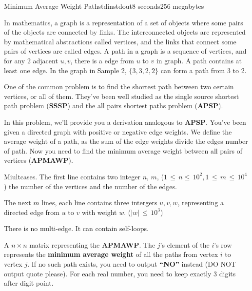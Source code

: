 \begin{problem}{Minimum Average Weight Path}{stdin}{stdout}{8 seconds}{256 megabytes}

In mathematics, a graph is a representation of a set of objects where some pairs of the objects are connected by links. The interconnected objects are represented by mathematical abstractions called vertices, and the links that connect some pairs of vertices are called edges. A path in a graph is a sequence of vertices, and for any 2 adjacent $u,v$, there is a edge from $u$ to $v$ in graph. A path contains at least one edge. In the graph in Sample 2, $\{3, 3, 2, 2\}$ can form a path from 3 to 2. 

One of the common problem is to find the shortest path between two certain vertices, or all of them. They've been well studied as the single source shortest path problem (\textbf{SSSP}) and 
the all pairs shortest paths problem (\textbf{APSP}).

In this problem, we'll provide you a derivation analogous to \textbf{APSP}.
You've been given a directed graph with positive or negative edge weights.
We define the average weight of a path, as the sum of the edge weights divide the edges number of path. Now you need to find the minimum average weight between all pairs of vertices (\textbf{APMAWP}). 

\InputFile
Miultcases. The first line contains two integer $n$, $m$, ($1\,\leq\,n\leq\,10^2,1\,\leq\,m\,\leq\,10^4$  ) the number of the vertices and the number of the edges.

The next $m$ lines, each line contains three intergers $u, v, w$, representing a directed edge from $u$ to $v$ with weight $w$. ($|w|\,\leq\,10^3$)

There is no multi-edge. It can contain self-loops. 


\OutputFile
A $n\times n$ matrix representing the \textbf{APMAWP}. The $j$'s element of the $i$'s row represents the \textbf{minimum average weight} of all the paths from vertex $i$ to vertex $j$. If no such path exists, you need to output \textbf{``NO''} instead (DO NOT output quote please). For each real number, you need to keep exactly 3 digits after digit point.

\Examples

\begin{example}
%
%
\end{example}

\end{problem}
